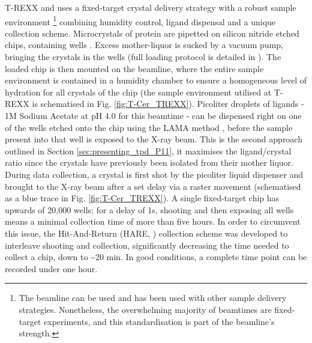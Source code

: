 T-REXX and uses a fixed-target crystal delivery strategy with a robust sample environment \footnote{The beamline can be used and has been used with other sample delivery strategies. Nonetheless, the overwhelming majority of beamtimes are fixed-target experiments, and this standardisation is part of the beamline's strength.} combining humidity control, ligand dispensal and a unique collection scheme. Microcrystals of protein are pipetted on silicon nitride etched chips, containing wells \parencite{muellerFixedTargetMatrix2015}. Excess mother-liquor is sucked by a vacuum pump, bringing the crystals in the wells (full loading protocol is detailed in \cite{schulzHitandreturnSystemEnables2018}). The loaded chip is then mounted on the beamline, where the entire sample environment is contained in a humidity chamber to ensure a homogeneous level of hydration for all crystals of the chip (the sample environment utilised at T-REXX is schematised in Fig. \ref{fig:T-Cer_TREXX}). Picoliter droplets of ligands - 1M Sodium Acetate at pH 4.0 for this beamtime - can be dispensed right on one of the wells etched onto the chip using the LAMA method \parencite{mehrabiLiquidApplicationMethod2019}, before the sample present into that well is exposed to the X-ray beam. This is the second approach outlined in Section \ref{sec:presenting_tpd_P11}, it maximises the ligand/crystal ratio since the crystals have previously been isolated from their mother liquor. During data collection, a crystal is first shot by the picoliter liquid dispenser and brought to the X-ray beam after a set delay via a raster movement (schematised as a blue trace in Fig. \ref{fig:T-Cer_TREXX}). A single fixed-target chip has upwards of 20,000 wells; for a delay of 1s, shooting and then exposing all wells means a minimal collection time of more than five hours. In order to circumvent this issue, the Hit-And-Return (HARE, \cite{schulzHitandreturnSystemEnables2018}) collection scheme was developed to interleave shooting and collection, significantly decreasing the time needed to collect a chip, down to \textasciitilde 20 min. In good conditions, a complete time point can be recorded under one hour. 

